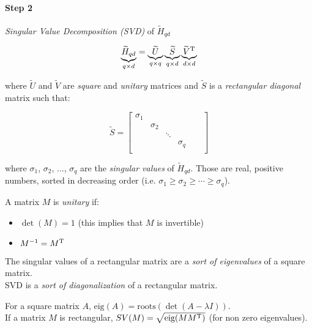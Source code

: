 \paragraph{Step 2} \emph{Singular Value Decomposition (SVD)} of $\tilde{H}_{qd}$

\[
    \underbrace{\widetilde{H}_{qd}}_{q\times d} = \underbrace{\widetilde{U}}_{q\times q} \underbrace{\widetilde{S}}_{q\times d} \underbrace{\widetilde{V}^{\mathrm{T}}}_{d\times d}
\]

where $\tilde{U}$ and $\tilde{V}$ are \emph{square} and \emph{unitary} matrices and $\tilde{S}$ is a \emph{rectangular diagonal} matrix such that:

\[
    \tilde{S} = \begin{bmatrix}
        \sigma_1 & & & & &\\
        & \sigma_2 & & & &\\
        & & \ddots & & &\\
        & & & \sigma_q & &\\
    \end{bmatrix}
\]

where $\sigma_1$, $\sigma_2$, $\ldots$, $\sigma_q$ are the \emph{singular values} of $\tilde{H}_{qd}$.
Those are real, positive numbers, sorted in decreasing order (i.e. $\sigma_1 \ge \sigma_2 \ge \cdots \ge \sigma_q$).

\begin{definition}
    A matrix $M$ is \emph{unitary} if:
    \begin{itemize}
        \item $\det (M) = 1$ \quad (this implies that $M$ is invertible)
        \item $M^{-1} = M^{\mathrm{T}}$
    \end{itemize}
\end{definition}

\begin{obs}
    The singular values of a rectangular matrix are a \emph{sort of eigenvalues} of a square matrix.\\
    SVD is a \emph{sort of diagonalization} of a rectangular matrix.
\end{obs}

\begin{recall}
    For a square matrix $A$, $\text{eig}(A) = \text{roots}(\det(A-\lambda I))$. \\
    If a matrix $M$ is rectangular, $SV(M) = \sqrt{\text{eig}(MM^{\mathrm{T}})}$ (for non zero eigenvalues).
\end{recall}

